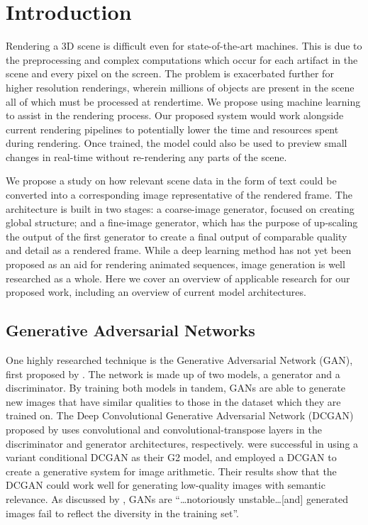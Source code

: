 \documentclass{article}
\begin{document}
\section{Introduction}
\label{sec:introduction}
Rendering a 3D scene is difficult
even for state-of-the-art machines. This is due to the
preprocessing and complex computations which occur for each
artifact in the scene and every pixel on the screen. The problem is exacerbated
further for higher resolution renderings, wherein millions of objects are present
in the scene all of which must be processed at rendertime.
We propose using machine learning to assist in the rendering process.
Our proposed system would work alongside current rendering pipelines
to potentially lower the time and resources spent during rendering.
Once trained, the model could also be used to preview small changes in
real-time without re-rendering any parts of the scene.

We propose a study on how relevant scene data in the form of text could be
converted into a corresponding image representative of the rendered frame.
The architecture is built in two stages: a coarse-image generator, focused on
creating global structure; and a fine-image generator, which has the purpose
of up-scaling the output of the first generator to create a final output
of comparable quality and detail as a rendered frame.
While a deep learning method has not yet been proposed as an aid for rendering
animated sequences, image generation is well researched as a whole.
Here we cover an overview of applicable research for our proposed work,
including an overview of current model architectures.

\subsection{Generative Adversarial Networks}
\label{subsec:gan}
One highly researched technique is the Generative Adversarial Network (GAN),
first proposed by \cite{generative_adversarial_networks}.
The network is made up of two models,
a generator and a discriminator.
By training both models in tandem,
GANs are able to generate new images that have similar qualities to
those in the dataset which they are trained on.
The Deep Convolutional Generative Adversarial Network (DCGAN)
proposed by \cite{unsupervised_learning}
uses convolutional and convolutional-transpose layers in
the discriminator and generator architectures, respectively.
\cite{pose_guided_image_generation} were successful in using
a variant conditional DCGAN as their G2 model, and
\cite{unsupervised_learning} employed a DCGAN to
create a generative system for image arithmetic.
Their results show that the DCGAN could work well
for generating low-quality images with semantic relevance.
As discussed by \cite{image_transformer}, GANs are
``\dots notoriously unstable\dots [and] generated images fail to reflect
the diversity in the training set''.
\end{document}
